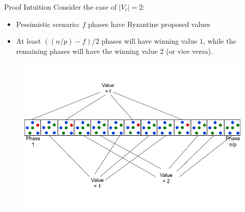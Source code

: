 \documentclass{beamer}
\begin{document}
\begin{frame}{Proof Intuition}
Consider the case of $|V_c|=2$:
\begin{itemize}
    \item Pessimistic scenario: $f$ phases have Byzantine proposed values
    \item At least $((n/p)-f)/2$ phases will have winning value $1$, while the remaining phases will have the winning value $2$ (or vice versa).
\end{itemize}
\vspace{-2em}
\begin{figure}[t]
\centering
\includegraphics[scale=0.35]{proof4.png}
\end{figure}
\end{frame}
\end{document}
